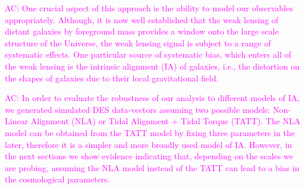 \documentclass[12pt]{article}
\newcommand{\acampos}[1]{\textcolor{magenta}{AC: #1}}
\begin{document}
\begin{small}
\acampos{One crucial aspect of this approach is the ability to model our observables appropriately. Although, it is now well established that the weak lensing of distant galaxies by foreground mass provides a window onto the large scale structure of the Universe, the weak lensing signal is subject to a range of systematic effects. One particular source of systematic bias, which enters all of the weak lensing is the intrinsic alignment (IA) of galaxies, i.e., the distortion on the shapes of galaxies due to their local gravitational field.} 

\acampos{In order to evaluate the robustness of our analysis to different models of IA, we generated simulated DES data-vectors assuming two possible models: Non-Linear Alignment (NLA) or Tidal Alignment + Tidal Torque (TATT). The NLA model can be obtained from the TATT model by fixing three parameters in the later, therefore it is a simpler and more broadly used model of IA. However, in the next sections we show evidence indicating that, depending on the scales we are probing, assuming the NLA model instead of the TATT can lead to a bias in the cosmological parameters.}   
%

\end{small}
\end{document}
